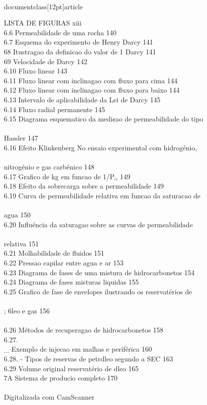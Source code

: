 \\documentclass[12pt]{article}
\begin{document}
LISTA DE FIGURAS xiii\\
6.6 Permeabilidade de uma rocha 140\\
6.7 Esquema do experimento de Henry Darcy 141\\
68 Itustragao da definicao do valor de 1 Darcy 141\\
69 Velocidade de Darcy 142\\
6.10 Fluxo linear 143\\
6.11 Fluxo linear com inclinagao com fluxo para cima 144\\
6.12 Fluxo linear com inclinagao com fluxo para baixo 144\\
6.13 Intervalo de aplicabilidade da Lei de Darcy 145\\
6.14 Fluxo radial permanente 145\\
6.15 Diagrama esquematico da medi¢ao de permeabilidade do tipo\\
\\
Hassler 147\\
6.16 Efeito Klinkenberg No ensaio experimental com hidrogénio,\\
\\
nitrogénio e gas carbénico 148\\
6.17 Grafico de kg em funcao de 1/P,, 149\\
6.18 Efeito da sobrecarga sobre a permeabilidade 149\\
6.19 Curva de permeabilidade relativa em funcao da saturacao de\\
\\
agua 150\\
6.20 Influéncia da saturagao sobre as curvas de permeabilidade\\
\\
relativa 151\\
6.21 Molhabilidade de fluidos 151\\
6.22 Pressao capilar entre agua e ar 153\\
6.23 Diagrama de fases de uma mistura de hidrocarbonetos 154\\
6.24 Diagrama de fases misturas liquidas 155\\
6.25 Grafico de fase de envelopes ilustrando os reservatérios de\\
\\
; 6leo e gas 156\\
\\
6.26 Métodos de recuperagao de hidrocarbonetos 158\\
6.27. \\_ Exemplo de injecao em malhas e periférica 160\\
6.28. - Tipos de reservas de petrdleo segundo a SEC 163\\
6.29 Volume original reservatério de dleo 165\\
7A Sistema de producio completo 170\\
\\
Digitalizada com CamScanner\\
\end{document}
